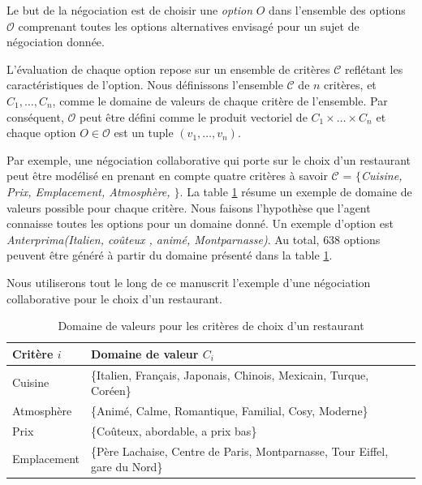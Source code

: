 		Le but de la négociation est de choisir une \textit{option} $O$ dans l'ensemble des options $\mathcal{O}$ comprenant toutes les options alternatives envisagé pour un sujet de négociation donnée. 
		
		L'évaluation de chaque option repose sur un ensemble de critères $\mathcal{C}$ reflétant les caractéristiques de l'option. Nous définissons l'ensemble $\mathcal{C}$ de $n$ critères, et $C_1,\ldots,C_n$, comme le domaine de valeurs de chaque critère de l'ensemble. 
		Par conséquent, $\mathcal{O}$ peut être défini comme le produit vectoriel de  $C_1\times\ldots\times C_n$ et chaque option $O \in \mathcal{O}$ est un tuple $(v_1,\ldots,v_n)$. 
		
		Par exemple, une négociation collaborative qui porte sur le choix d'un restaurant peut être modélisé en prenant en compte quatre critères à savoir $\mathcal{C}$ = \emph{$\{$Cuisine, Prix, Emplacement, Atmosphère, $\}$}. La table \ref{tab:domain} résume un exemple de domaine de valeurs possible pour chaque critère. Nous faisons l'hypothèse que l'agent connaisse toutes les options pour un domaine donné. Un exemple d'option est  \emph{Anterprima(Italien, coûteux , animé, Montparnasse)}. Au total, $638$ options peuvent être généré à partir du domaine présenté dans la table \ref{tab:domain}. 
		
		Nous utiliserons tout le long de ce manuscrit l'exemple d'une négociation collaborative pour le choix d'un restaurant. 
		\begin{table}[h]
			\centering
			\begin{tabular}{ >{\centering\arraybackslash}m{2.25cm}  >{\centering\arraybackslash}m{8.6cm}}
				\hline
				\hline
			\textbf{Critère $i $} &\textbf{ Domaine de valeur $C_i$} \\
				\hline
				Cuisine & \{Italien, Français, Japonais, Chinois, Mexicain, Turque, Coréen\} \\
				\hline
				Atmosphère & \{Animé, Calme, Romantique, Familial, Cosy, Moderne\} \\
				\hline
				Prix & \{Coûteux, abordable, a prix bas\} \\
				\hline
				Emplacement & \{Père Lachaise, Centre de Paris, Montparnasse, Tour Eiffel, gare du Nord\} \\
				\hline
				\hline
			\end{tabular}
			\caption{Domaine de valeurs pour les critères de choix d'un restaurant} 
			\label{tab:domain}
		\end{table}
		

